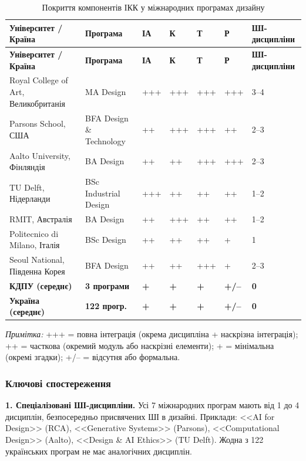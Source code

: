 \begin{longtable}{@{}p{}p{}p{}p{}p{}p{}p{}@{}}
\caption{Покриття компонентів ІКК у міжнародних програмах дизайну}\label{tab:international-benchmark} \\
\hline
\textbf{Університет / Країна} & \textbf{Програма} & \textbf{ІА} & \textbf{К} & \textbf{Т} & \textbf{Р} & \textbf{ШІ-дисципліни} \\
\hline
\endfirsthead
\hline
\textbf{Університет / Країна} & \textbf{Програма} & \textbf{ІА} & \textbf{К} & \textbf{Т} & \textbf{Р} & \textbf{ШІ-дисципліни} \\
\hline
\endhead
Royal College of Art, Великобританія & MA Design & +++ & +++ & +++ & +++ & 3--4 \\
Parsons School, США & BFA Design \& Technology & ++ & +++ & +++ & ++ & 2--3 \\
Aalto University, Фінляндія & BA Design & ++ & ++ & +++ & +++ & 2--3 \\
TU Delft, Нідерланди & BSc Industrial Design & +++ & ++ & ++ & ++ & 1--2 \\
RMIT, Австралія & BA Design & ++ & +++ & ++ & ++ & 1--2 \\
Politecnico di Milano, Італія & BSc Design & ++ & ++ & ++ & + & 1 \\
Seoul National, Південна Корея & BFA Design & ++ & ++ & +++ & + & 2--3 \\
\addlinespace
\textbf{КДПУ (середнє)} & \textbf{3 програми} & \textbf{+} & \textbf{+} & \textbf{+} & \textbf{+/--} & \textbf{0} \\
\addlinespace
\textbf{Україна (середнє)} & \textbf{122 прогр.} & \textbf{+} & \textbf{+} & \textbf{+} & \textbf{+/--} & \textbf{0} \\
\hline
\end{longtable}

\textit{Примітка:} +++ = повна інтеграція (окрема дисципліна + наскрізна інтеграція); ++ = часткова (окремий модуль або наскрізні елементи); + = мінімальна (окремі згадки); +/-- = відсутня або формальна.

\subsubsection{Ключові спостереження}\label{sssec:2.3.3}

\textbf{1. Спеціалізовані ШІ-дисципліни.} Усі 7 міжнародних програм мають від 1 до 4 дисциплін, безпосередньо присвячених ШІ в дизайні. Приклади: <<AI for Design>> (RCA), <<Generative Systems>> (Parsons), <<Computational Design>> (Aalto), <<Design \& AI Ethics>> (TU Delft). Жодна з 122 українських програм не має аналогічних дисциплін.

